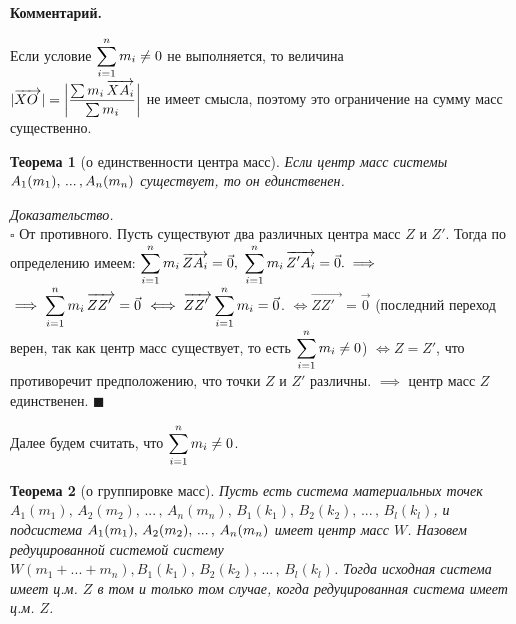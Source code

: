 \documentclass[14pt]{extarticle}
\let\vecarrow\overrightarrow
\newtheorem*{theorem}{\normalfont\fontsize{15}{15}\textup{Теорема}}
\newtheorem*{remark}{\textup{Комментарий}}
\renewenvironment{proof}
    {\noindent \textit{Доказательство.}\\
	\indent $\square$}
	{ $\blacksquare$\\ }
\renewenvironment{remark}
    {\noindent\textbf{Комментарий.}}
\DeclarePairedDelimiter\abs{\lvert}{\rvert}
\begin{document}
\begin{remark}
	{
    Если условие $\mathlarger{\sum_{i=1}^{n} m_i \ne 0}$ не выполняется,
	то величина \\
	$\mathlarger{|\vecarrow{XO_{\;}}| = \abs[\bigg]{\frac{\sum m_i \,
	\vecarrow{XA_i}}{\sum m_i}}}$  не имеет смысла, поэтому это
	ограничение на сумму масс существенно.\par
    }
\end{remark}

\begin{theorem}[о единственности центра масс]
    Если центр масс системы $A_1(m_1), \\  \, ... \, ,A_n(m_n)$
	существует, то он единственен.
\end{theorem}

\begin{proof}
От противного. Пусть существуют два различных центра масс $Z$ и $Z'$.
Тогда по определению имеем: $\mathlarger{\sum_{i=1}^{n} m_i \, \vecarrow{ZA_i}
= \vec{0},}$ \quad $\mathlarger{\sum_{i=1}^{n} m_i \, \vecarrow{Z'A_i}} = \vec{0}. 
\implies$\\
$\implies \mathlarger{\sum_{i=1}^{n} m_i \, \vecarrow{ZZ'_{\;\:\,}}} = \vec{0}$
$\iff \mathlarger{\vecarrow{ZZ'_{\;\:\,}} \sum_{i=1}^{n} m_i} = \vec{0}$. 
$\iff \vecarrow{ZZ'_{\;\:\,}} = \vec{0}$ (последний переход верен, 
так как центр масс существует, то есть
$\mathlarger{\sum_{i=1}^{n} m_i \ne 0}$) $\iff Z = Z'$, что противоречит
предположению, что точки $Z$ и $Z'$ различны. $\implies$ центр масс $Z$
единственен.
\end{proof}

\noindent Далее будем считать, что $\mathlarger{\sum_{i=1}^{n} m_i \ne 0}$.

\begin{theorem}[о группировке масс]
Пусть есть система материальных точек $A_1(m_1),  \, A_2(m_2), \, ... \, ,
\, A_n(m_n), \, B_1(k_1), \, B_2(k_2), \, ... \, , \, B_l(k_l)$, 
	и подсистема $A_1(m_1), \\ \, A_2(m_2), \, ... \, , 
	\, A_n(m_n)$ имеет центр масс $W$.
Назовем редуцированной системой систему $W(m_1 + ... + m_n), B_1(k_1),
\, B_2(k_2), \, ... \, , \, B_l(k_l)$. Тогда исходная система имеет ц.м. $Z$
в том и только том случае, когда редуцированная система имеет ц.м. $Z$.
\end{theorem}


\end{document}
